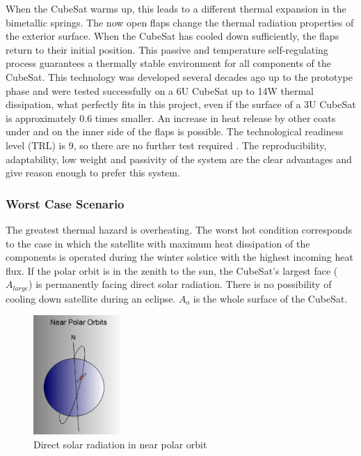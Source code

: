When the CubeSat warms up, this leads to a different thermal expansion in the bimetallic
springs. The now open flaps change the thermal radiation properties of the exterior
surface. When the CubeSat has cooled down sufficiently, the flaps return to their
initial position. This passive and temperature self-regulating process guarantees
a thermally stable environment for all components of the CubeSat. This technology
was developed several decades ago up to the prototype phase and were tested
successfully on a 6U CubeSat up to 14W thermal dissipation, what perfectly fits
in this project, even if the surface of a 3U CubeSat is approximately 0.6 times
smaller. An increase in heat release by other coats under and on the inner side
of the flaps is possible. The technological readiness level (TRL) is 9, so there
are no further test required \cite{NASA_thermal}.
The reproducibility, adaptability, low weight and passivity of the system are
the clear advantages and give reason enough to prefer this system. \cite{Thermal_NASA_patent}

\subsubsection{Worst Case Scenario}

The greatest thermal hazard is overheating. The worst hot condition corresponds
to the case in which the satellite with maximum heat dissipation of the components
is operated during the winter solstice with the highest incoming heat flux.
If the polar orbit is in the zenith to the sun, the CubeSat’s largest face
($A_{large}$) is permanently facing direct solar radiation. There is no possibility
of cooling down satellite during an eclipse. $A_o$ is the whole surface of the CubeSat.


\begin{figure}[h]
	\centering
	\includegraphics[width=0.3\textwidth]{img/near_polar_orbit.png}
	\caption{Direct solar radiation in near polar orbit}
	\label{fig:near_polar_orbit}
\end{figure}


